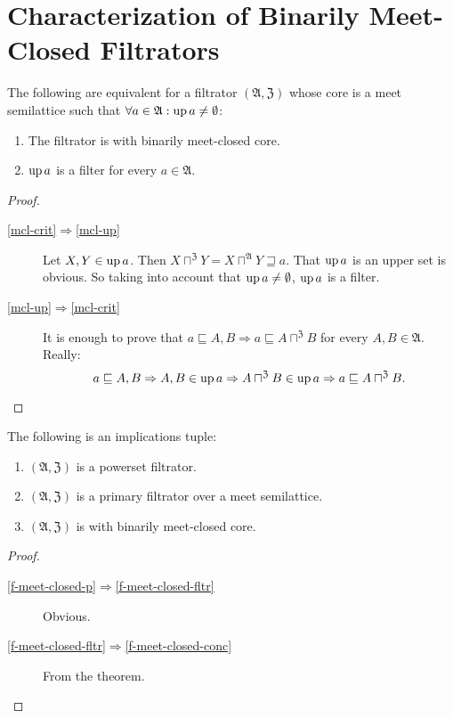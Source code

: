 \section{Characterization of Binarily Meet-Closed Filtrators}
\begin{thm}
\label{up-filt-crit}The following are equivalent for a filtrator
$(\mathfrak{A},\mathfrak{Z})$ whose core is a meet semilattice such
that $\forall a\in\mathfrak{A}:\operatorname{up} a\ne\emptyset$:
\begin{enumerate}
\item \label{mcl-crit}The filtrator is with binarily meet-closed core.
\item \label{mcl-up}$\operatorname{up} a$ is a filter for every $a\in\mathfrak{A}$.
\end{enumerate}
\end{thm}
\begin{proof}
~
\begin{description}
\item [{\ref{mcl-crit}$\Rightarrow$\ref{mcl-up}}] Let $X,Y\in\operatorname{up} a$.
Then $X\sqcap^{\mathfrak{Z}}Y=X\sqcap^{\mathfrak{A}}Y\sqsupseteq a$.
That $\operatorname{up} a$ is an upper set is obvious. So taking into account that
$\operatorname{up} a\ne\emptyset$, $\operatorname{up} a$ is a filter.
\item [{\ref{mcl-up}$\Rightarrow$\ref{mcl-crit}}] It is enough to prove
that $a\sqsubseteq A,B\Rightarrow a\sqsubseteq A\sqcap^{\mathfrak{Z}}B$
for every $A,B\in\mathfrak{A}$. Really:
\[
a\sqsubseteq A,B\Rightarrow A,B\in\operatorname{up} a\Rightarrow A\sqcap^{\mathfrak{Z}}B\in\operatorname{up} a\Rightarrow a\sqsubseteq A\sqcap^{\mathfrak{Z}}B.
\]

\end{description}
\end{proof}
\begin{cor}
\label{f-meet-closed}The following is an implications tuple:
\begin{enumerate}
\item \label{f-meet-closed-p}$(\mathfrak{A},\mathfrak{Z})$ is a powerset
filtrator.
\item \label{f-meet-closed-fltr}$(\mathfrak{A},\mathfrak{Z})$ is a primary
filtrator over a meet semilattice.
\item \label{f-meet-closed-conc}$(\mathfrak{A},\mathfrak{Z})$ is with
binarily meet-closed core.
\end{enumerate}
\end{cor}
\begin{proof}
~
\begin{description}
\item [{\ref{f-meet-closed-p}$\Rightarrow$\ref{f-meet-closed-fltr}}] Obvious.
\item [{\ref{f-meet-closed-fltr}$\Rightarrow$\ref{f-meet-closed-conc}}] From
the theorem.
\end{description}
\end{proof}

